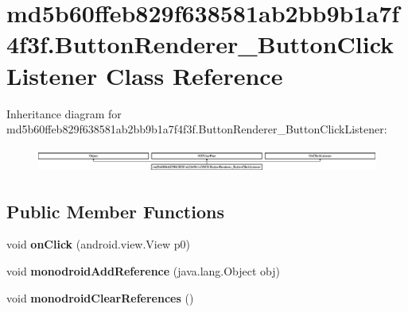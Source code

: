 \hypertarget{classmd5b60ffeb829f638581ab2bb9b1a7f4f3f_1_1ButtonRenderer__ButtonClickListener}{}\section{md5b60ffeb829f638581ab2bb9b1a7f4f3f.\+Button\+Renderer\+\_\+\+Button\+Click\+Listener Class Reference}
\label{classmd5b60ffeb829f638581ab2bb9b1a7f4f3f_1_1ButtonRenderer__ButtonClickListener}
Inheritance diagram for md5b60ffeb829f638581ab2bb9b1a7f4f3f.\+Button\+Renderer\+\_\+\+Button\+Click\+Listener\+:\begin{figure}[H]
\begin{center}
\leavevmode
\includegraphics[height=0.818713cm]{classmd5b60ffeb829f638581ab2bb9b1a7f4f3f_1_1ButtonRenderer__ButtonClickListener}
\end{center}
\end{figure}
\subsection*{Public Member Functions}
\begin{DoxyCompactItemize}
\item 
\mbox{\label{classmd5b60ffeb829f638581ab2bb9b1a7f4f3f_1_1ButtonRenderer__ButtonClickListener_a73c958e3551a985f92dbe6bde665dfbc}} 
void {\bfseries on\+Click} (android.\+view.\+View p0)
\item 
\mbox{\label{classmd5b60ffeb829f638581ab2bb9b1a7f4f3f_1_1ButtonRenderer__ButtonClickListener_ae77c28c48a6a3831721989497df67679}} 
void {\bfseries monodroid\+Add\+Reference} (java.\+lang.\+Object obj)
\item 
\mbox{\label{classmd5b60ffeb829f638581ab2bb9b1a7f4f3f_1_1ButtonRenderer__ButtonClickListener_a412bbbc9b7d969906bb6c597440b57b6}} 
void {\bfseries monodroid\+Clear\+References} ()
\end{DoxyCompactItemize}
